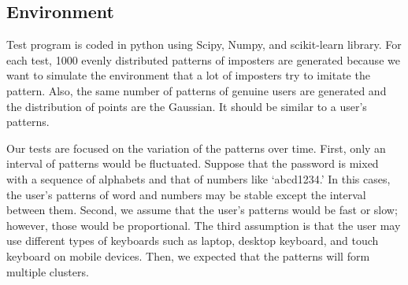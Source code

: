 \documentclass[twocolumn,showpacs,%
  nofootinbib,aps,%
  eqsecnum,prd,notitlepage,showkeys,10pt]{revtex4-1}
\begin{document}
\subsection{Environment}
Test program is coded in python using Scipy, Numpy, and scikit-learn library. For each test, 1000 evenly distributed patterns of imposters are generated because we want to simulate the environment that a lot of imposters try to imitate the pattern. Also, the same number of patterns of genuine users are generated and the distribution of points are the Gaussian. It should be similar to a user's patterns.
\par
Our tests are focused on the variation of the patterns over time. First, only an interval of patterns would be fluctuated. Suppose that the password is mixed with a sequence of alphabets and that of numbers like `abcd1234.' In this cases, the user's patterns of word and numbers may be stable except the interval between them. Second, we assume that the user's patterns would be fast or slow; however, those would be proportional. The third assumption is that the user may use different types of keyboards such as laptop, desktop keyboard, and touch keyboard on mobile devices. Then, we expected that the patterns will form multiple clusters.
\end{document}
